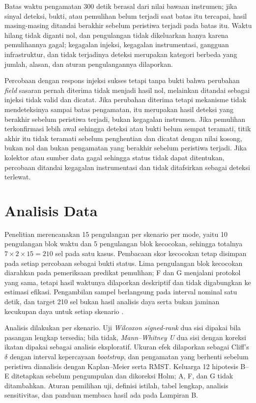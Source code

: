 Batas waktu pengamatan 300 detik berasal dari nilai bawaan instrumen; jika sinyal deteksi, bukti, atau pemulihan belum terjadi saat batas itu tercapai, hasil masing-masing ditandai berakhir sebelum peristiwa terjadi pada batas itu. Waktu hilang tidak diganti nol, dan pengulangan tidak dikeluarkan hanya karena pemulihannya gagal; kegagalan injeksi, kegagalan instrumentasi, gangguan infrastruktur, dan tidak terjadinya deteksi merupakan kategori berbeda yang jumlah, alasan, dan aturan pengulangannya dilaporkan.

Percobaan dengan respons injeksi sukses tetapi tanpa bukti bahwa perubahan \textit{field} sasaran pernah diterima tidak menjadi hasil nol, melainkan ditandai sebagai injeksi tidak valid dan dicatat. Jika perubahan diterima tetapi mekanisme tidak mendeteksinya sampai batas pengamatan, itu merupakan hasil deteksi yang berakhir sebelum peristiwa terjadi, bukan kegagalan instrumen. Jika pemulihan terkonfirmasi lebih awal sehingga deteksi atau bukti belum sempat teramati, titik akhir itu tidak teramati sebelum penghentian dan dicatat dengan nilai kosong, bukan nol dan bukan pengamatan yang berakhir sebelum peristiwa terjadi. Jika kolektor atau sumber data gagal sehingga status tidak dapat ditentukan, percobaan ditandai kegagalan instrumentasi dan tidak ditafsirkan sebagai deteksi terlewat.

\section{Analisis Data}

Penelitian merencanakan 15 pengulangan per skenario per mode, yaitu 10 pengulangan blok waktu dan 5 pengulangan blok kecocokan, sehingga totalnya $7 \times 2 \times 15 = 210$ sel pada satu kasus. Pembacaan skor kecocokan tetap disimpan pada setiap percobaan sebagai bukti status. Lima pengulangan blok kecocokan diarahkan pada pemeriksaan predikat pemulihan; F dan G menjalani protokol yang sama, tetapi hasil waktunya dilaporkan deskriptif dan tidak digabungkan ke estimasi efikasi. Pengambilan sampel berlangsung pada interval nominal satu detik, dan target 210 sel bukan hasil analisis daya serta bukan jaminan kecukupan daya untuk setiap skenario \citep{dyba2006power,kitchenham2024small}.

Analisis dilakukan per skenario. Uji \textit{Wilcoxon signed-rank} dua sisi dipakai bila pasangan lengkap tersedia; bila tidak, \textit{Mann--Whitney U} dua sisi dengan koreksi ikatan dipakai sebagai analisis eksploratif. Ukuran efek dilaporkan sebagai Cliff's $\delta$ dengan interval kepercayaan \textit{bootstrap}, dan pengamatan yang berhenti sebelum peristiwa dianalisis dengan Kaplan--Meier serta RMST. Keluarga 12 hipotesis B--E ditetapkan sebelum pengumpulan dan dikoreksi Holm; A, F, dan G tidak ditambahkan. Aturan pemilihan uji, definisi istilah, tabel lengkap, analisis sensitivitas, dan panduan membaca hasil ada pada Lampiran B.

